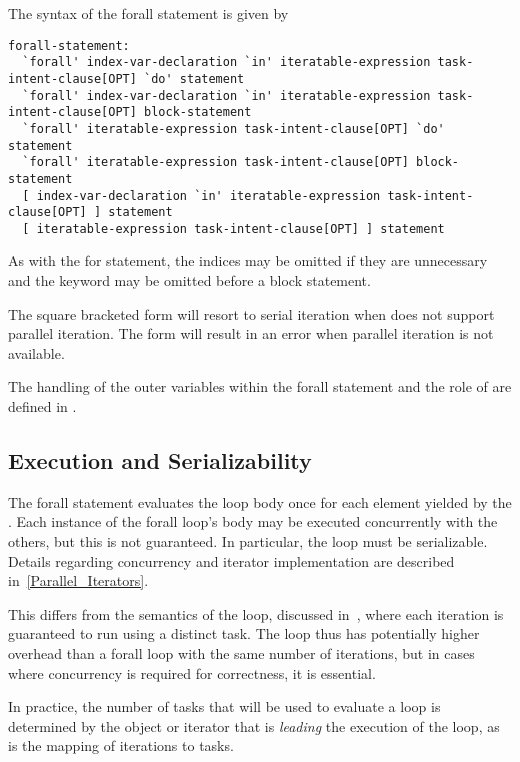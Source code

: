 The syntax of the forall statement is given by
\begin{syntax}
\begin{verbatim}
forall-statement:
  `forall' index-var-declaration `in' iteratable-expression task-intent-clause[OPT] `do' statement
  `forall' index-var-declaration `in' iteratable-expression task-intent-clause[OPT] block-statement
  `forall' iteratable-expression task-intent-clause[OPT] `do' statement
  `forall' iteratable-expression task-intent-clause[OPT] block-statement
  [ index-var-declaration `in' iteratable-expression task-intent-clause[OPT] ] statement
  [ iteratable-expression task-intent-clause[OPT] ] statement
\end{verbatim}
\end{syntax}
As with the for statement, the indices may be omitted if they are
unnecessary and the  keyword may be omitted before a block
statement.

The square bracketed form will resort to serial iteration
when  does not support parallel iteration.
The  form will result in an error when parallel iteration
is not available.

The handling of the outer variables within the forall statement and
the role of  are defined in .

\subsection{Execution and Serializability}
\label{forall_semantics}

The forall statement evaluates the loop body once for each element
yielded by the .  Each instance of the
forall loop's body may be executed concurrently with the others, but
this is not guaranteed.  In particular, the loop must be serializable.
Details regarding concurrency and iterator implementation are
described in~\ref{Parallel_Iterators}.

This differs from the semantics of the  loop, discussed
in~, where each iteration is guaranteed to run using a
distinct task.  The  loop thus has potentially higher
overhead than a forall loop with the same number of iterations, but in
cases where concurrency is required for correctness, it is essential.

In practice, the number of tasks that will be used to evaluate
a  loop is determined by the object or iterator that
is \emph{leading} the execution of the loop, as is the mapping of
iterations to tasks.

